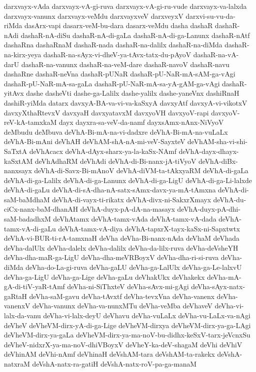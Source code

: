 {darxvayx-vAda
darxvayx-vA-gi-ruva
darxvayx-vA-gi-ru-vude
darxvayx-va-lalxda
darxvayx-vanunx
darxvayx-veMdu
darxvayxveV
darxveyxV
darxvi-su-vu-da-riMda
dasArx-vapi
dasarx-veM-bu-dara
dasarx-veMdu
dasha
dashaR
dashaR-nAdi
dashaR-nA-diSu
dashaR-nA-di-gaLa
dashaR-nA-di-ga-Lanunx
dashaR-nAtf
dashaRna
dashaRnaM
dashaR-nada
dashaR-na-dalilx
dashaR-na-diMda
dashaR-na-kirx-yeya
dashaR-na-sAyx-vi-dheV-ya-tAvx-tatx-du-pAyoV
dashaR-na-vA-darU
dashaR-na-vanunx
dashaR-na-veM-dare
dashaR-navoV
dashaR-navu
dashaRne
dashaR-neVna
dashaR-pUNaR
dashaR-pU-NaR-mA-sAM-ga-vAgi
dashaR-pU-NaR-mA-sa-gaLa
dashaR-pU-NaR-mA-sa-yA-gAM-ga-vAgi
dashaR-yitAvx
dashe
dasheVti
dashe-ga-Lalilx
dashe-yalilx
dashe-yaneVnx
dashiRnaH
dashiR-yiMda
datarx
davxyA-BA-va-vi-va-kaSxyA
davxyAtf
davxyA-vi-vikotxV
davxyXthaRtevxV
davxyaH
davxyatavxM
davxyoVH
davxyoV-rapi
davxyoV-reV-kA-tamxkaM
dayx
dayxra-sa-veV-da-namf
dayxsAmx-nAnx-NiVyoV
deMbudu
deMbuva
deVhA-Bi-mA-na-vi-dadxre
deVhA-Bi-mA-na-vuLaLx
deVhA-Bi-mAni
deVhAH
deVhAM-shA-nA-mi-veV-SayxteV
deVhAM-sha-vi-shi-SaTxtA
deVhAcacx
deVhA-dAyx-sharx-ya-la-kaSx-NAmf
deVhA-dayx-dhayx-kaSxtAM
deVhAdhaRM
deVhAdi
deVhA-di-Bi-nanx-jA-tiVyoV
deVhA-diBx-nanxsayx
deVhA-di-Savx-Bi-mAnoV
deVhA-diVM-ta-tAkxyaRM
deVhA-di-gaLa
deVhA-di-ga-Lalilx
deVhA-di-ga-Lanunx
deVhA-di-ga-LigU
deVhA-di-ga-Li-lalxde
deVhA-di-gaLu
deVhA-di-sA-dha-nA-satx-sAmx-davx-ya-mA-tAmxna
deVhA-di-saM-baMdhaM
deVhA-di-vayx-ti-rikatx
deVhA-divx-ni-SakxrXmayx
deVhA-du-ciCx-nanx-baM-dhanAH
deVhA-duyx-pA-dA-na-masayx
deVhA-duyx-pA-dhi-saM-badadhxM
deVhAtamx
deVhA-tamx-vAda
deVhA-tamx-vA-dada
deVhA-tamx-vA-di-gaLu
deVhA-tamx-vA-diya
deVhA-tapxrX-tayx-kaSx-ni-Sapxtwtx
deVhA-vi-BUR-ti-rA-tamxnaH
deVha
deVha-Bi-nanx-nAda
deVhaM
deVhada
deVha-dalUlx
deVha-dalelx
deVha-dalilx
deVha-da-lilx-ruva
deVha-deVsheYH
deVha-dha-maR-ga-LigU
deVha-dha-meVRBoyxV
deVha-dha-ri-si-ruva
deVha-diMda
deVha-do-La-gi-ruva
deVha-gaLU
deVha-ga-LalUlx
deVha-ga-Le-lalxvU
deVha-ga-LigU
deVha-ga-Lige
deVha-gaLu
deVhakUkx
deVhakekx
deVha-mA-gA-di-tiV-yaR-tAmf
deVha-ni-SiThxteV
deVha-sAvx-mi-gAgi
deVha-sAyx-natx-gaRtaH
deVha-saM-gavu
deVha-tAvxtf
deVha-tevxVna
deVha-vanenx
deVha-vanenxV
deVha-vanunx
deVha-va-nunxMTu
deVha-veMba
deVhaveV
deVha-vi-lalx-da-vanu
deVha-vi-lalx-deyU
deVhavu
deVha-vuLaLx
deVha-vu-LaLx-va-nAgi
deVheV
deVheVM-dirx-yA-di-ga-Lige
deVheVM-dirxya
deVheVM-dirx-ya-ga-LAgi
deVheVM-dirx-ya-gaLa
deVheVM-dirx-ya-ma-noV-bu-didhx-keSxV-tarx-jeVcnxSu
deVheV-nidxrX-ya-ma-noV-dhiVBoyxV
deVheY-ka-deV-shagaM
deVhi
deVhiV
deVhinAM
deVhi-nAmf
deVhinaH
deVshAM-tara
deVshAM-ta-rakekx
deVshA-natxraM
deVshA-natx-ra-gatiH
deVshA-natx-roV-pa-ga-manaM
}
